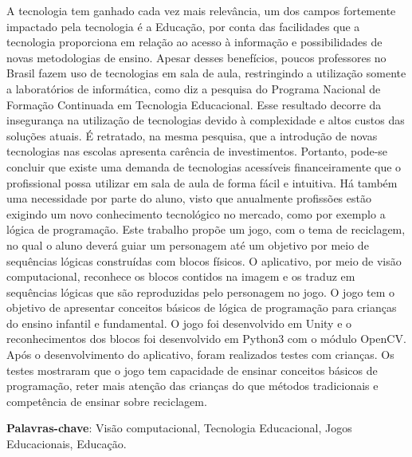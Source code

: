     \setlength{\absparsep}{18pt} 
    \begin{resumo}
    
A tecnologia tem ganhado cada vez mais relevância, um dos campos fortemente impactado pela tecnologia é a Educação, por conta das facilidades que a tecnologia proporciona em relação ao acesso à informação e possibilidades de novas metodologias de ensino.
Apesar desses benefícios, poucos professores no Brasil fazem uso de tecnologias em sala de aula, restringindo a utilização somente a laboratórios de informática, como diz a pesquisa do Programa Nacional de Formação Continuada em Tecnologia Educacional. Esse resultado decorre da insegurança na utilização de tecnologias devido à complexidade e altos custos das soluções atuais. É retratado, na mesma pesquisa, que a introdução de novas tecnologias nas escolas apresenta carência de investimentos.
Portanto, pode-se concluir que existe uma demanda de tecnologias acessíveis financeiramente que o profissional possa utilizar em sala de aula de forma fácil e intuitiva.
Há também uma necessidade por parte do aluno, visto que anualmente profissões estão exigindo um novo conhecimento tecnológico no mercado, como por exemplo a lógica de programação.
Este trabalho propõe um jogo, com o tema de reciclagem, no qual o aluno deverá guiar um personagem até um objetivo por meio de sequências lógicas construídas com blocos físicos. O aplicativo, por meio de visão computacional, reconhece os blocos contidos na imagem e os traduz em sequências lógicas que são reproduzidas pelo personagem no jogo. O jogo tem o objetivo de apresentar conceitos básicos de lógica de programação para crianças do ensino infantil e fundamental. O jogo foi desenvolvido em Unity e o reconhecimentos dos blocos foi desenvolvido em Python3 com o módulo OpenCV.
Após o desenvolvimento do aplicativo, foram realizados testes com crianças. Os testes mostraram que o jogo tem capacidade de ensinar conceitos básicos de programação, reter mais atenção das crianças do que métodos tradicionais e competência de ensinar sobre reciclagem.

         \textbf{Palavras-chave}: Visão computacional, Tecnologia Educacional, Jogos Educacionais, Educação.
    \end{resumo}

